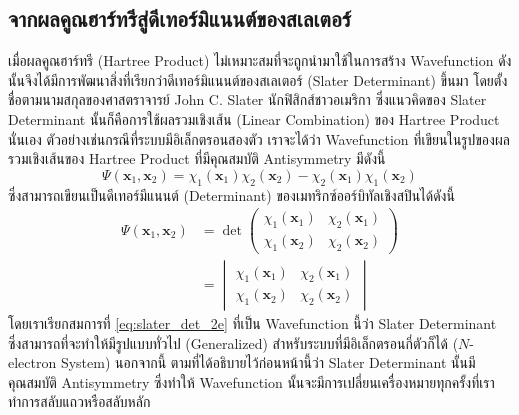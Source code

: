 \subsection{จากผลคูณฮาร์ทรีสู่ดีเทอร์มิแนนต์ของสเลเตอร์}
\label{ssec:hartree_prod_to_slater_deter}

เมื่อผลคูณฮาร์ทรี (Hartree Product) ไม่เหมาะสมที่จะถูกนำมาใช้ในการสร้าง Wavefunction ดังนั้นจึงได้มีการพัฒนาสิ่งที่เรียกว่าดีเทอร์มิแนนต์ของสเลเตอร์ (Slater Determinant) ขึ้นมา โดยตั้งชื่อตามนามสกุลของศาสตราจารย์ John C. Slater นักฟิสิกส์ชาวอเมริกา ซึ่งแนวคิดของ Slater Determinant นั้นก็คือการใช้ผลรวมเชิงเส้น (Linear Combination) ของ Hartree Product นั่นเอง\autocite{slater1929} ตัวอย่างเช่นกรณีที่ระบบมีอิเล็กตรอนสองตัว เราจะได้ว่า Wavefunction ที่เขียนในรูปของผลรวมเชิงเส้นของ Hartree Product ที่มีคุณสมบัติ Antisymmetry มีดังนี้
%
\begin{equation}\label{eq:lin_com_hartree_prod}
    \Psi(\bm{x}_{1}, \bm{x}_{2}) = \chi_{1}(\bm{x}_{1})\chi_{2}(\bm{x}_{2}) -
    \chi_{2}(\bm{x}_{1})\chi_{1}(\bm{x}_{2})
\end{equation}
%
\noindent ซึ่งสามารถเขียนเป็นดีเทอร์มีแนนต์ (Determinant) ของเมทริกซ์ออร์บิทัลเชิงสปินได้ดังนี้
%
\begin{align}\label{eq:slater_det_2e}
    \Psi(\bm{x}_{1}, \bm{x}_{2}) & =
    \det \begin{pmatrix}
             \chi_{1}(\bm{x}_{1}) & \chi_{2}(\bm{x}_{1}) \\
             \chi_{1}(\bm{x}_{2}) & \chi_{2}(\bm{x}_{2})
         \end{pmatrix} \nonumber                             \\
                                 & = \begin{vmatrix}
                                         \chi_{1}(\bm{x}_{1}) & \chi_{2}(\bm{x}_{1}) \\
                                         \chi_{1}(\bm{x}_{2}) & \chi_{2}(\bm{x}_{2})
                                     \end{vmatrix}
\end{align}
%
\noindent โดยเราเรียกสมการที่ \eqref{eq:slater_det_2e} ที่เป็น Wavefunction นี้ว่า Slater Determinant ซึ่งสามารถที่จะทำให้มีรูปแบบทั่วไป (Generalized) สำหรับระบบที่มีอิเล็กตรอนกี่ตัวก็ได้ ($N$-electron System) นอกจากนี้ ตามที่ได้อธิบายไว้ก่อนหน้านี้ว่า Slater Determinant นั้นมีคุณสมบัติ Antisymmetry ซึ่งทำให้ Wavefunction นั้นจะมีการเปลี่ยนเครื่องหมายทุกครั้งที่เราทำการสลับแถวหรือสลับหลัก

